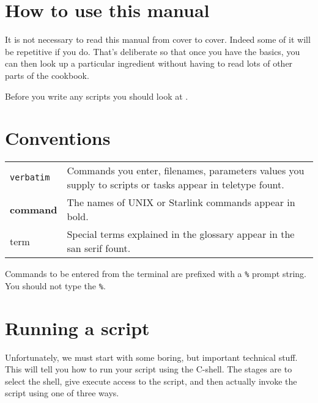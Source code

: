 \newpage

\section{How to use this manual}

It is not necessary to read this manual from cover to cover.  Indeed
some of it will be repetitive if you do.  That's deliberate so that
once you have the basics, you can then look up a particular ingredient
without having to read lots of other parts of the cookbook.

Before you write any scripts you should look at
.

\section{Conventions}
\begin{tabular}{lp{120mm}}
{\tt verbatim}   &  Commands you enter, filenames, parameters values
                    you supply to scripts or tasks appear in teletype
                    fount. \\
{\bf command}    &  The names of UNIX or Starlink commands appear
                    in bold. \\
{\sf term}       &  Special terms explained in the glossary appear
                    in the san serif fount. \\
\end{tabular}

Commands to be entered from the terminal are prefixed with a {\tt \%}
prompt string.  You should not type the {\tt \%}.

\newpage
\section{Running a script\label{sc4_se_running}}

Unfortunately, we must start with some boring, but important technical
stuff.  This will tell you how to run your script using the C-shell.  The
stages are to select the shell, give execute access to the script, and
then actually invoke the script using one of three ways.

